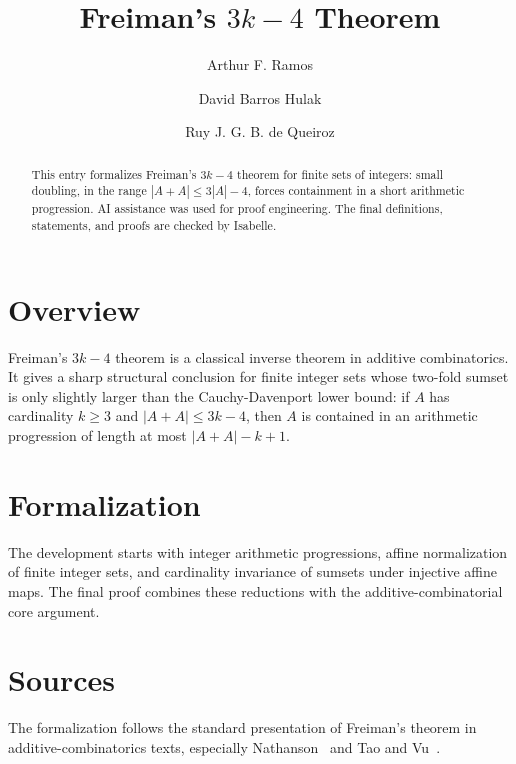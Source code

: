 \documentclass[11pt,a4paper]{article}
\begin{document}
\title{Freiman's \(3k - 4\) Theorem}
\author{Arthur F. Ramos \and David Barros Hulak \and Ruy J. G. B. de Queiroz}
\maketitle

\begin{abstract}
This entry formalizes Freiman's \(3k - 4\) theorem for finite sets of integers:
small doubling, in the range \(|A + A| \leq 3|A| - 4\), forces containment in a
short arithmetic progression. AI assistance was used for proof engineering. The
final definitions, statements, and proofs are checked by Isabelle.
\end{abstract}

\section{Overview}

Freiman's \(3k - 4\) theorem is a classical inverse theorem in additive
combinatorics. It gives a sharp structural conclusion for finite integer sets
whose two-fold sumset is only slightly larger than the Cauchy-Davenport lower
bound: if \(A\) has cardinality \(k \geq 3\) and \(|A + A| \leq 3k - 4\), then
\(A\) is contained in an arithmetic progression of length at most
\(|A + A| - k + 1\).

\section{Formalization}

The development starts with integer arithmetic progressions, affine
normalization of finite integer sets, and cardinality invariance of sumsets
under injective affine maps. The final proof combines these reductions with the
additive-combinatorial core argument.

\section{Sources}

The formalization follows the standard presentation of Freiman's theorem in
additive-combinatorics texts, especially Nathanson~\cite{Nathanson1996} and
Tao and Vu~\cite{TaoVu2006}.

\tableofcontents

\sloppy

\fussy



\end{document}
